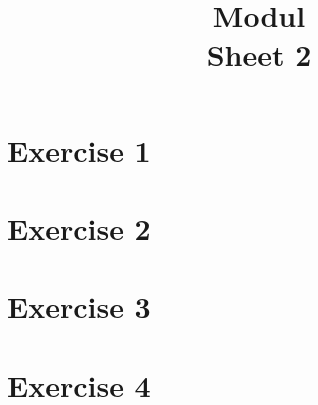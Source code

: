 \documentclass[bibliography=totocnumbered]{scrartcl}
\title{Modul\\Sheet 2}
\begin{document}
    \maketitle
    \tableofcontents
    \listoffigures
    
    \newpage
    \section{Exercise 1}

    \newpage
    \section{Exercise 2}

    \newpage
    \section{Exercise 3}

    \newpage
    \section{Exercise 4}

    \newpage
    \appendix
    \printbibliography[title={Sources}]
\end{document}
